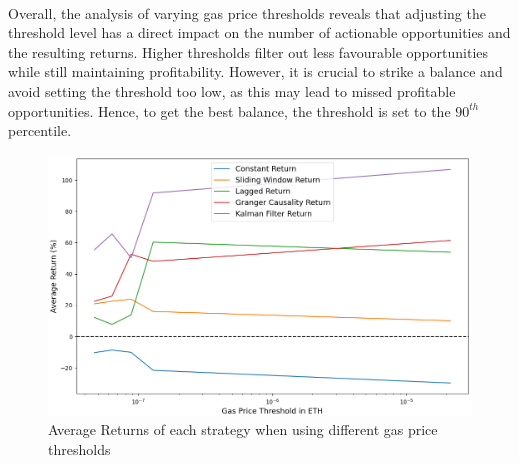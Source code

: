 \\[3mm]
Overall, the analysis of varying gas price thresholds reveals that adjusting the threshold level has a direct impact on the number of actionable opportunities and the resulting returns. Higher thresholds filter out less favourable opportunities while still maintaining profitability. However, it is crucial to strike a balance and avoid setting the threshold too low, as this may lead to missed profitable opportunities. Hence, to get the best balance, the threshold is set to the $90^{th}$ percentile.

\begin{figure}[H]
    \centering
    \includegraphics[width=\linewidth]{evaluation/Images/VaryGPThreshold.png}
    \caption{Average Returns of each strategy when using different gas price thresholds}
    \label{fig:VaryGasPriceThresholds}
\end{figure}

